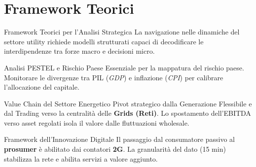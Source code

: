 
\section{Framework Teorici}

\begin{frame}{Framework Teorici per l'Analisi Strategica}
    La navigazione nelle dinamiche del settore utility richiede modelli strutturati capaci di decodificare le interdipendenze tra forze macro e decisioni micro.
    \vspace{0.2cm}
    

    \begin{block}{Analisi PESTEL e Rischio Paese}
        Essenziale per la mappatura del rischio paese. Monitorare le divergenze tra PIL (\textit{GDP}) e inflazione (\textit{CPI}) per calibrare l'allocazione del capitale.
    \end{block}
    \vspace{0.1cm}
    \pause

    \begin{block}{Value Chain del Settore Energetico}
        Pivot strategico dalla Generazione Flessibile e dal Trading verso la centralità delle \textbf{Grids (Reti)}. Lo spostamento dell'EBITDA verso asset regolati isola il valore dalle fluttuazioni wholesale.
    \end{block}
    \vspace{0.1cm}
    \pause

    \begin{block}{Framework dell'Innovazione Digitale}
        Il passaggio dal consumatore passivo al \textbf{prosumer} è abilitato dai contatori \textbf{2G}. La granularità del dato (15 min) stabilizza la rete e abilita servizi a valore aggiunto.
    \end{block}
\end{frame}


